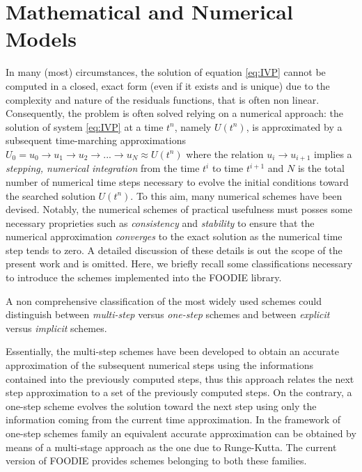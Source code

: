 \section{Mathematical and Numerical Models}\label{sec:MNmodels}

In many (most) circumstances, the solution of equation \ref{eq:IVP} cannot be computed in a closed, exact form (even if it exists and is unique) due to the complexity and nature of the residuals functions, that is often non linear. Consequently, the problem is often solved relying on a numerical approach: the solution of system \ref{eq:IVP} at a time $t^n$, namely $U(t^n)$, is approximated by a subsequent time-marching approximations $U_0=u_0 \rightarrow u_1 \rightarrow u_2 \rightarrow ... \rightarrow u_N\approx U(t^n)$ where the relation $u_i \rightarrow u_{i+1}$ implies a \emph{stepping, numerical integration} from the time $t^i$ to time $t^{i+1}$ and $N$ is the total number of numerical time steps necessary to evolve the initial conditions toward the searched solution $U(t^n)$. To this aim, many numerical schemes have been devised. Notably, the numerical schemes of practical usefulness must posses some necessary proprieties such as \emph{consistency} and \emph{stability} to ensure that the numerical approximation \emph{converges} to the exact solution as the numerical time step tends to zero. A detailed discussion of these details is out the scope of the present work and is omitted. Here, we briefly recall some classifications necessary to introduce the schemes implemented into the FOODIE library.

A non comprehensive classification of the most widely used schemes could distinguish between \emph{multi-step} versus \emph{one-step} schemes and between \emph{explicit} versus \emph{implicit} schemes.

Essentially, the multi-step schemes have been developed to obtain an accurate approximation of the subsequent numerical steps using the informations contained into the previously computed steps, thus this approach relates the next step approximation to a set of the previously computed steps. On the contrary, a one-step scheme evolves the solution toward the next step using only the information coming from the current time approximation. In the framework of one-step schemes family an equivalent accurate approximation can be obtained by means of a multi-stage approach as the one due to Runge-Kutta. The current version of FOODIE provides schemes belonging to both these families.

